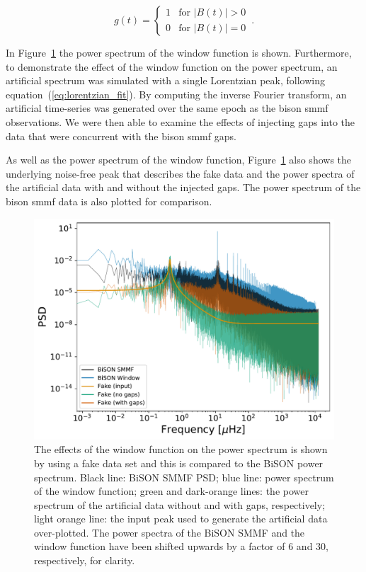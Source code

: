 \begin{equation}
g(t) = 
\begin{cases} 
1 & \text{for } |B(t)| > 0 \\
0       & \text{for } |B(t)| = 0
\end{cases} \, .
\label{eq:window}
\end{equation}

In Figure~\ref{fig:window_function_PSDs} the power spectrum of the window function is shown. Furthermore, to demonstrate the effect of the window function on the power spectrum, an artificial spectrum was simulated with a single Lorentzian peak, following equation~(\ref{eq:lorentzian_fit}). By computing the inverse Fourier transform, an artificial time-series was generated over the same epoch as the \gls{bison} \gls{smmf} observations. We were then able to examine the effects of injecting gaps into the data that were concurrent with the \gls{bison} \gls{smmf} gaps. 

As well as the power spectrum of the window function, Figure~\ref{fig:window_function_PSDs} also shows the underlying noise-free peak that describes the fake data and the power spectra of the artificial data with and without the injected gaps. The power spectrum of the \gls{bison} \gls{smmf} data is also plotted for comparison.

\begin{figure}[ht!]
	\centering
	\includegraphics[width=\columnwidth]{gap_test.pdf}
	\caption{The effects of the window function on the power spectrum is shown by using a fake data set and this is compared to the BiSON power spectrum. Black line: BiSON SMMF PSD; blue line: power spectrum of the window function; green and dark-orange lines: the power spectrum of the artificial data without and with gaps, respectively; light orange line: the input peak used to generate the artificial data over-plotted. The power spectra of the BiSON SMMF and the window function have been shifted upwards by a factor of 6 and 30, respectively, for clarity.}
	\label{fig:window_function_PSDs}
\end{figure}


